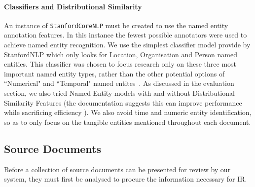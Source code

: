 \documentclass{l4proj}
\newcommand{\code}[1]{\texttt{#1}}
\begin{document}
\paragraph{Classifiers and Distributional Similarity} \label{classifiers}
An instance of \code{StanfordCoreNLP} must be created to use the named entity annotation features.
In this instance the fewest possible annotators were used to achieve named entity recognition.
We use the simplest classifier model provide by StanfordNLP which only looks for Location, Organisation and Person named entities. This classifier was chosen to focus research only on these three most important named entity types, rather than the other potential options of ``Numerical" and ``Temporal" named entites~\cite{neroptions}.
As discussed in the evaluation section, we also tried Named Entity models with and without Distributional Similarity Features (the documentation suggests this can improve performance while sacrificing efficiency \cite{distsimfeatures}).
We also avoid time and numeric entity identification, so as to only focus on the tangible entities mentioned throughout each document.

\subsection{Source Documents}
Before a collection of source documents can be presented for review by our system, they must first be analysed to procure the information necessary for IR.
\end{document}
